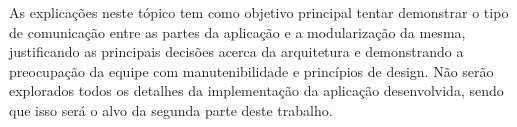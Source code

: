 As explicações neste tópico tem como objetivo principal tentar demonstrar o tipo de comunicação entre as partes da aplicação e a modularização da mesma, justificando as principais decisões acerca da arquitetura e demonstrando a preocupação da equipe com manutenibilidade e princípios de design. Não serão explorados todos os detalhes da implementação da aplicação desenvolvida, sendo que isso será o alvo da segunda parte deste trabalho.